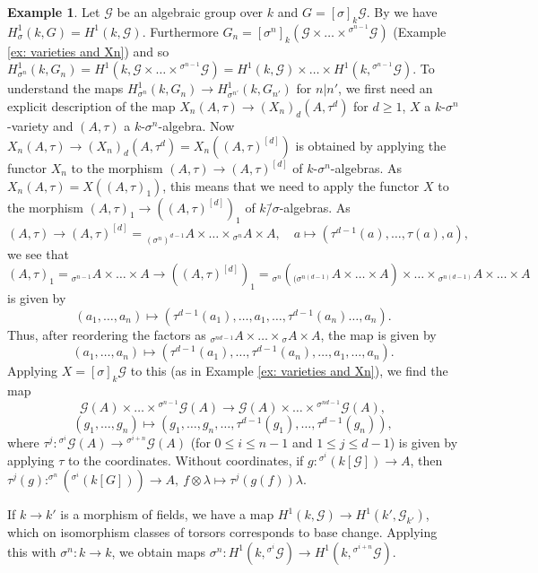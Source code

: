 \documentclass[oneside,reqno]{amsart}
\theoremstyle{definition}
\newtheorem{ex}[theo]{Example}
\newcommand{\G}{\mathcal{G}}
\newcommand{\s}{\sigma}
\newcommand{\ks}{$k$\=/$\s$}
\newcommand{\hsi}{^{\sigma^i}\!}
\begin{document}
\begin{ex} \label{ex: direct limit}
	Let $\G$ be an algebraic group over $k$ and $G=[\s]_k\G$. By \cite[Prop. 3.5]{BachmayrWibmer:TorsorsForDifferenceAlgebraicGroups} we have $H^1_\s(k,G)=H^1(k,\G)$. Furthermore $G_n=[\s^n]_k(\G\times\ldots\times{^{\s^{n-1}}\!\G})$ (Example \ref{ex: varieties and Xn}) and so $H^1_{\s^n}(k,G_n)=H^1(k,\G\times\ldots\times{^{\s^{n-1}}\!\G})=H^1(k,\G)\times\ldots\times H^1(k,{^{\s^{n-1}}\!\G})$. To understand the maps 
	$H^1_{\s^n}(k,G_n)\to H^1_{\s^{n'}}(k,G_{n'})$ for $n|n'$, we first need an explicit description of the map $X_n(A,\tau)\to (X_n)_d(A,\tau^d)$ for $d\geq 1$, $X$ a $k$-$\s^n$-variety and $(A,\tau)$ a $k$-$\s^n$-algebra. Now $X_n(A,\tau)\to (X_n)_d(A,\tau^d)=X_n((A,\tau)^{[d]})$
	is obtained by applying the functor $X_n$ to the morphism $(A,\tau)\to (A,\tau)^{[d]}$ of $k$-$\s^n$-algebras.
	As $X_n(A,\tau)=X((A,\tau)_1)$, this means that we need to apply the functor $X$ to the morphism $(A,\tau)_1\to ((A,\tau)^{[d]})_1$ of \ks-algebras. As $$(A,\tau)\to (A,\tau)^{[d]}={_{(\s^n)^{d-1}}}A\times\ldots\times{_{\s^n}}A\times A,\quad a\mapsto (\tau^{d-1}(a),\ldots,\tau(a),a),$$ 
	we see that 
	$$(A,\tau)_1={_{\s^{n-1}}}A\times\ldots\times A\longrightarrow ((A,\tau)^{[d]})_1={_{\s^n}}({_{(\s^{n(d-1)}}}A\times\ldots\times A)\times\ldots\times {_{\s^{n(d-1)}}}A\times\ldots\times A $$
	is given by $$(a_1,\ldots,a_n)\longmapsto(\tau^{d-1}(a_1),\ldots,a_1,\ldots,\tau^{d-1}(a_n)\ldots,a_n).$$ Thus, after reordering the factors as $_{\s^{nd-1}}A\times \ldots\times {_{\s}A}\times A$, the map is given by $$(a_1,\ldots,a_n)\mapsto (\tau^{d-1}(a_1),\ldots,\tau^{d-1}(a_n),\ldots,a_1,\ldots,a_n).$$ Applying $X=[\s]_k\G$ to this (as in Example \ref{ex: varieties and Xn}), we find the map	$$\G(A)\times\ldots\times{^{\s^{n-1}}\!\G}(A)\longrightarrow \G(A)\times\ldots\times{^{\s^{nd-1}}\!\G}(A),$$ \begin{equation}\label{eq: for H}(g_1,\ldots,g_n)\longmapsto (g_1,\ldots,g_n,\ldots,\tau^{d-1}(g_1),\ldots,\tau^{d-1}(g_n)),
		\end{equation}
	where $\tau^j\colon {\hsi}\G(A)\to {^{\s^{i+n}}\!\G}(A)$ (for $0\leq i\leq n-1$ and $1\leq j\leq d-1$) is given by applying $\tau$ to the coordinates. Without coordinates, if $g\colon {\hsi}(k[\G])\to A$, then $\tau^j(g)\colon^{\s^{n}}\!({^{\s^{i}}\!(k[G])})\to A,\ f\otimes\lambda\mapsto \tau^j(g(f))\lambda$.
	
	If $k\to k'$ is a morphism of fields, we have a map $H^1(k,\G)\to H^1(k',\G_{k'})$, which on isomorphism classes of torsors corresponds to base change. Applying this with $\s^n\colon k\to k$, we obtain maps $\s^n\colon H^1(k,{\hsi\G})\to H^1(k,{^{\s^{i+n}}\!\G})$. 
	

\end{ex}
\end{document}
